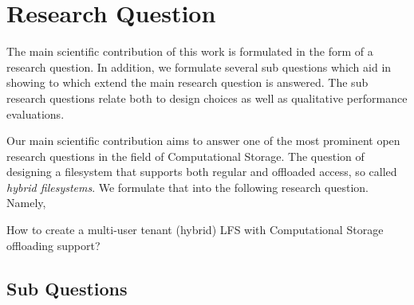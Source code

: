 \section{Research Question}

The main scientific contribution of this work is formulated in the form of a
research question. In addition, we formulate several sub questions which aid in
showing to which extend the main research question is answered. The sub research
questions relate both to design choices as well as qualitative performance
evaluations.

Our main scientific contribution aims to answer one of the most prominent open
research questions in the field of Computational Storage. The question of
designing a filesystem that supports both regular and offloaded access, so
called \textit{hybrid filesystems}. We formulate that into the following
research question. Namely,

\begin{displayquote}
    How to create a multi-user tenant (hybrid) LFS with Computational Storage
    offloading support?
\end{displayquote}

\subsection{Sub Questions}


